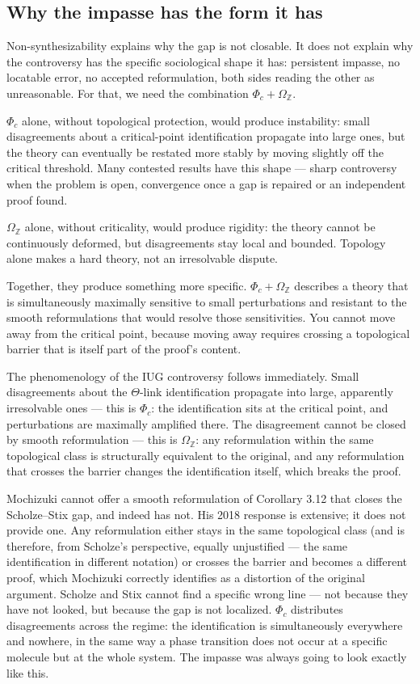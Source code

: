 \documentclass[12pt]{article}
\theoremstyle{plain}
\theoremstyle{definition}
\theoremstyle{remark}
\newcommand{\bZ}{\mathbb{Z}}
\begin{document}
\subsection{Why the impasse has the form it has}
\label{subsec:form}

Non-synthesizability explains why the gap is not closable. It does not explain why the
controversy has the specific sociological shape it has: persistent impasse, no locatable error,
no accepted reformulation, both sides reading the other as unreasonable. For that, we need
the combination $\Phi_c + \Omega_\bZ$.

$\Phi_c$ alone, without topological protection, would produce instability: small disagreements
about a critical-point identification propagate into large ones, but the theory can eventually
be restated more stably by moving slightly off the critical threshold. Many contested results
have this shape --- sharp controversy when the problem is open, convergence once a gap is
repaired or an independent proof found.

$\Omega_\bZ$ alone, without criticality, would produce rigidity: the theory cannot be
continuously deformed, but disagreements stay local and bounded. Topology alone makes a
hard theory, not an irresolvable dispute.

Together, they produce something more specific. $\Phi_c + \Omega_\bZ$ describes a theory
that is simultaneously maximally sensitive to small perturbations and resistant to the
smooth reformulations that would resolve those sensitivities. You cannot move away from the
critical point, because moving away requires crossing a topological barrier that is itself
part of the proof's content.

The phenomenology of the IUG controversy follows immediately. Small disagreements about the
$\Theta$-link identification propagate into large, apparently irresolvable ones --- this is
$\Phi_c$: the identification sits at the critical point, and perturbations are maximally
amplified there. The disagreement cannot be closed by smooth reformulation --- this is
$\Omega_\bZ$: any reformulation within the same topological class is structurally equivalent
to the original, and any reformulation that crosses the barrier changes the identification
itself, which breaks the proof.

Mochizuki cannot offer a smooth reformulation of Corollary 3.12 that closes the
Scholze--Stix gap, and indeed has not. His 2018 response is extensive; it does not provide
one. Any reformulation either stays in the same topological class (and is therefore, from
Scholze's perspective, equally unjustified --- the same identification in different notation)
or crosses the barrier and becomes a different proof, which Mochizuki correctly identifies
as a distortion of the original argument. Scholze and Stix cannot find a specific wrong line
--- not because they have not looked, but because the gap is not localized. $\Phi_c$
distributes disagreements across the regime: the identification is simultaneously everywhere
and nowhere, in the same way a phase transition does not occur at a specific molecule but at
the whole system. The impasse was always going to look exactly like this.
\end{document}

